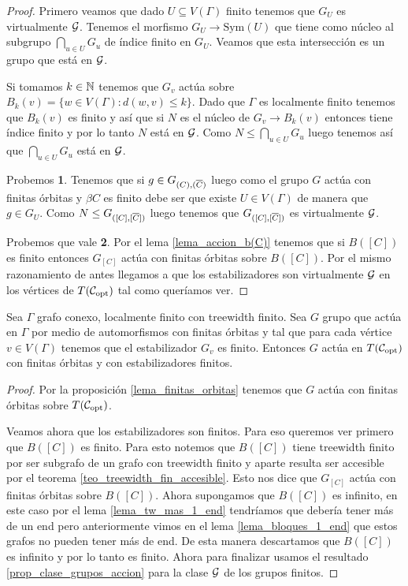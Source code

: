 \documentclass[tesis.tex]{subfiles}
\newcommand{\Sy}{\text{Sym}}
\begin{document}
\begin{proof}
	Primero veamos que dado $U \subseteq V(\Gamma)$ finito tenemos que $G_{U}$ es virtualmente ${\cal G}$.
	Tenemos el morfismo $G_{U} \to \Sy(U)$ que tiene como núcleo al subgrupo $\bigcap_{u \in U} G_u$ de índice finito en $G_U$.
	Veamos que esta intersección es un grupo que está en ${\cal G}$.
	
	Si tomamos $k \in \mathbb{N}$ tenemos que $G_{v}$ actúa sobre $B_{k}(v) = \{ w \in V(\Gamma) : d(w,v) \le k  \}$.
	Dado que $\Gamma$ es localmente finito tenemos que $B_{k}(v)$ es finito y así que si $N$ es el núcleo de $G_{v} \to B_{k}(v)$ entonces tiene índice finito y por lo tanto $N$ está en ${\cal G}$.
	Como $N \le \bigcap_{u \in U} G_{u}$ luego tenemos así que $\bigcap_{u \in U} G_{u}$ está en ${\cal G}$.

	Probemos \textbf{1}.
	Tenemos que si $g \in G_{(C),(\overline C)}$ luego como el grupo $G$ actúa con finitas órbitas y $\beta C$ es finito debe ser que existe $U \in V(\Gamma)$ de manera que $g \in G_{U}$.
	Como $N \le G_{([C],[\overline C])}$ luego tenemos que $G_{([C],[\overline C])}$ es virtualmente ${\cal G}$.
	
	Probemos que vale \textbf{2}.
	Por el lema \ref{lema_accion_b(C)} tenemos que si $B([C])$ es finito entonces $G_{[C]}$ actúa con finitas órbitas sobre $B([C])$.
	Por el mismo razonamiento de antes llegamos a que los estabilizadores son virtualmente ${\cal G}$ en los vértices de $T({\cal C}_{\text{opt}})$ tal como queríamos ver.
\end{proof}



\begin{teo}\label{teo_tw_accion_central}
	Sea $\Gamma$ grafo conexo, localmente finito con treewidth finito.
	Sea $G$ grupo que actúa en $\Gamma$ por medio de automorfismos con finitas órbitas y tal que para cada vértice $v \in V(\Gamma)$ tenemos que el estabilizador $G_{v}$ es finito.
	Entonces $G$ actúa en $T({\cal C}_{\text{opt}})$ con finitas órbitas y con estabilizadores finitos.
\end{teo}
\begin{proof}
	Por la proposición \ref{lema_finitas_orbitas} tenemos que $G$ actúa con finitas órbitas sobre $T({\cal C}_{\text{opt}})$.
	
	Veamos ahora que los estabilizadores son finitos.
	Para eso queremos ver primero que $B([C])$ es finito.
	Para esto notemos que $B([C])$ tiene treewidth finito por ser subgrafo de un grafo con treewidth finito y aparte resulta ser accesible por el teorema \ref{teo_treewidth_fin_accesible}.
	Esto nos dice que $G_{[C]}$ actúa con finitas órbitas sobre $B([C])$.
	Ahora supongamos que $B([C])$ es infinito, en este caso por el lema \ref{lema_tw_mas_1_end} tendríamos que debería tener más de un end pero anteriormente vimos en el lema \ref{lema_bloques_1_end} que estos grafos no pueden tener más de end.
	De esta manera descartamos que $B([C])$ es infinito y por lo tanto es finito.
	Ahora para finalizar usamos el resultado \ref{prop_clase_grupos_accion} para la clase ${\cal G}$ de los grupos finitos.
\end{proof}
\end{document}
